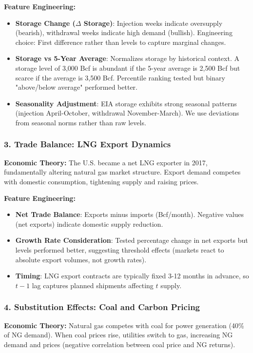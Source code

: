 \documentclass[12pt,a4paper]{article}
\begin{document}
\textbf{Feature Engineering:}
\begin{itemize}
    \item \textbf{Storage Change ($\Delta$ Storage)}: Injection weeks indicate oversupply (bearish), withdrawal weeks indicate high demand (bullish). Engineering choice: First difference rather than levels to capture marginal changes.
    \item \textbf{Storage vs 5-Year Average}: Normalizes storage by historical context. A storage level of 3,000 Bcf is abundant if the 5-year average is 2,500 Bcf but scarce if the average is 3,500 Bcf. Percentile ranking tested but binary "above/below average" performed better.
    \item \textbf{Seasonality Adjustment}: EIA storage exhibits strong seasonal patterns (injection April-October, withdrawal November-March). We use deviations from seasonal norms rather than raw levels.
\end{itemize}

\subsubsection{3. Trade Balance: LNG Export Dynamics}

\textbf{Economic Theory:} The U.S. became a net LNG exporter in 2017, fundamentally altering natural gas market structure. Export demand competes with domestic consumption, tightening supply and raising prices.

\textbf{Feature Engineering:}
\begin{itemize}
    \item \textbf{Net Trade Balance}: Exports minus imports (Bcf/month). Negative values (net exports) indicate domestic supply reduction.
    \item \textbf{Growth Rate Consideration}: Tested percentage change in net exports but levels performed better, suggesting threshold effects (markets react to absolute export volumes, not growth rates).
    \item \textbf{Timing}: LNG export contracts are typically fixed 3-12 months in advance, so $t-1$ lag captures planned shipments affecting $t$ supply.
\end{itemize}

\subsubsection{4. Substitution Effects: Coal and Carbon Pricing}

\textbf{Economic Theory:} Natural gas competes with coal for power generation (40\% of NG demand). When coal prices rise, utilities switch to gas, increasing NG demand and prices (negative correlation between coal price and NG returns).
\end{document}
